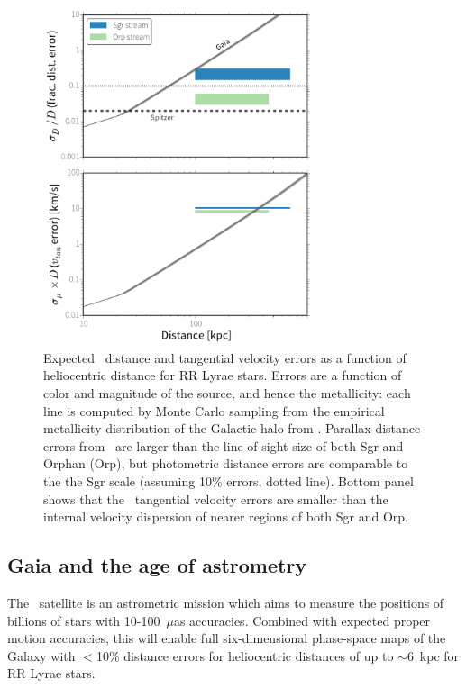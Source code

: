 \begin{figure}[hp!]
\begin{center}
\includegraphics[width=0.7\textwidth]{figures/ch1/fig1.pdf}

\caption{Expected \gaia\ distance and tangential velocity errors as a
function of heliocentric distance for RR Lyrae stars. Errors are a function of
color and magnitude of the source, and hence the metallicity: each line is
computed by Monte Carlo sampling from the empirical metallicity distribution of
the Galactic halo from \cite{ivezic08}. Parallax distance errors from \gaia\
are larger than the line-of-sight size of both Sgr and Orphan (Orp), but
photometric distance errors are comparable to the the Sgr scale (assuming 10\%
errors, dotted line). Bottom panel shows that the \gaia\ tangential velocity
errors are smaller than the internal velocity dispersion of nearer regions of
both Sgr and Orp. }\label{fig:gaia_errors}
\end{center}
\end{figure}

\subsection{Gaia and the age of astrometry}
\label{sec:gaia}
The \gaia\ satellite \citep{gaia01} is an astrometric mission which aims to
measure the positions of billions of stars with 10-100~$\mu$as accuracies.
Combined with expected proper motion accuracies, this will enable full
six-dimensional phase-space maps of the Galaxy with $<$10\% distance errors for
heliocentric distances of up to $\sim$6~kpc for RR Lyrae stars.

